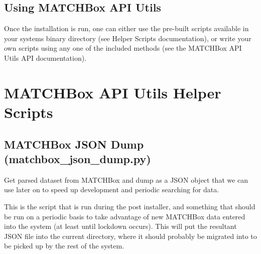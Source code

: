 \documentclass[letterpaper,10pt,english]{sphinxmanual}
\begin{document}
\section{Using MATCHBox API Utils}
\label{\detokenize{intro:using-matchbox-api-utils}}
Once the installation is run, one can either use the pre-built scripts available
in your systems binary directory (see Helper Scripts documentation), or write
your own scripts using any one of the included methods (see the MATCHBox API Utils
API documentation).


\chapter{MATCHBox API Utils Helper Scripts}
\label{\detokenize{helper_scripts:matchbox-api-utils-helper-scripts}}\label{\detokenize{helper_scripts::doc}}

\section{MATCHBox JSON Dump (matchbox\_json\_dump.py)}
\label{\detokenize{helper_scripts:matchbox-json-dump-matchbox-json-dump-py}}
Get parsed dataset from MATCHBox and dump as a JSON object that we can use
later on to speed up development and periodic searching for data.

This is the script that is run during the post installer, and something that
should be run on a periodic basis to take advantage of new MATCHBox data entered
into the system (at least until lockdown occurs).  This will put the resultant
JSON file into the current directory, where it should probably be migrated into
 to be picked up by the rest of the system.
\end{document}
